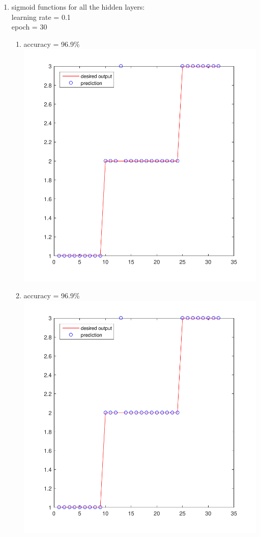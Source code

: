 \documentclass[12pt,a4paper]{article}
\begin{document}
\begin{CJK}{UTF8}{bsmi}
\begin{enumerate}
\begin{enumerate}
\begin{enumerate}
\begin{enumerate}
			\newpage	
		\end{enumerate}
		\item sigmoid functions for all the hidden layers:
		\\
		learning rate = 0.1 \\
		epoch = 30
		\begin{enumerate}
			\item accuracy = 96.9\%\ \\
			\includegraphics[scale=0.6]{winess1}
			\newpage	
			\item accuracy = 96.9\%\ \\
			\includegraphics[scale=0.6]{winess1}	

\end{enumerate}
\end{enumerate}
\end{enumerate}
\end{enumerate}
\end{CJK}
\end{document}
